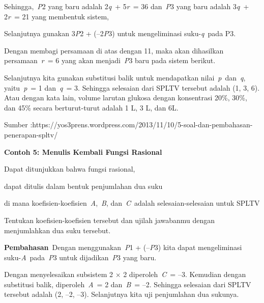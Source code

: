 \documentclass[11pt,fleqn]{book} %
\begin{document}
\begin{myEnumerate}
\begin{itemize}
\noindent Sehingga,~\textit{P}2 yang baru adalah 2\textit{q}~+ 5\textit{r}~= 36 dan~\textit{P}3 yang baru adalah 3\textit{q}~+ 2\textit{r}~= 21 yang membentuk sistem,

\noindent 

\noindent Selanjutnya gunakan 3\textit{P}2 + (--2\textit{P}3) untuk mengeliminasi suku-\textit{q}~pada P3.

\noindent 

\noindent 

\noindent Dengan membagi persamaan di atas dengan 11, maka akan dihasilkan persamaan~\textit{r}~= 6 yang akan menjadi~\textit{P}3 baru pada sistem berikut.

\noindent 

\noindent Selanjutnya kita gunakan substitusi balik untuk mendapatkan nilai~\textit{p}~dan~\textit{q}, yaitu~\textit{p}~= 1 dan~\textit{q}~= 3. Sehingga selesaian dari SPLTV tersebut adalah (1, 3, 6). Atau dengan kata lain, volume larutan glukosa dengan konsentrasi 20\%, 30\%, dan 45\% secara berturut-turut adalah 1 L, 3 L, dan 6L.

\noindent Sumber :https://yos3prens.wordpress.com/2013/11/10/5-soal-dan-pembahasan-penerapan-spltv/

\noindent 

\noindent \textbf{Contoh 5: Menulis Kembali Fungsi Rasional}

\noindent Dapat ditunjukkan bahwa fungsi rasional,

\noindent 

\noindent dapat ditulis dalam bentuk penjumlahan dua suku

\noindent 

\noindent di mana koefisien-koefisien~\textit{A},~\textit{B}, dan~\textit{C}~adalah selesaian-selesaian untuk SPLTV

\noindent 

\noindent Tentukan koefisien-koefisien tersebut dan ujilah jawabanmu dengan menjumlahkan dua suku tersebut.

\noindent 

\noindent \textbf{Pembahasan}~Dengan menggunakan~\textit{P}1 + (--\textit{P}3) kita dapat mengeliminasi suku-\textit{A}~pada~\textit{P}3 untuk dijadikan~\textit{P}3 yang baru.

\noindent 

\noindent 

\noindent Dengan menyelesaikan subsistem 2 $\times$ 2 diperoleh~\textit{C}~= --3. Kemudian dengan substitusi balik, diperoleh~\textit{A}~= 2 dan~\textit{B}~= --2. Sehingga selesaian dari SPLTV tersebut adalah (2, --2, --3). Selanjutnya kita uji penjumlahan dua sukunya.


\end{itemize}
\end{myEnumerate}
\end{document}
